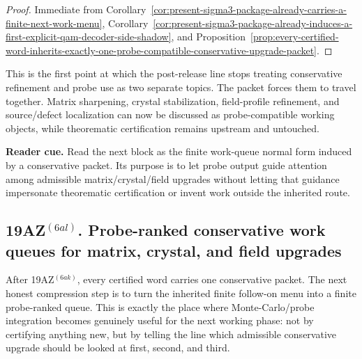 \begin{proof}
Immediate from Corollary~\ref{cor:present-sigma3-package-already-carries-a-finite-next-work-menu}, Corollary~\ref{cor:present-sigma3-package-already-induces-a-first-explicit-qam-decoder-side-shadow}, and Proposition~\ref{prop:every-certified-word-inherits-exactly-one-probe-compatible-conservative-upgrade-packet}.
\end{proof}

\begin{remark}
\label{rem:what-this-conservative-packet-now-buys}
This is the first point at which the post-release line stops treating conservative refinement and probe use as two separate topics. The packet forces them to travel together. Matrix sharpening, crystal stabilization, field-profile refinement, and source/defect localization can now be discussed as probe-compatible working objects, while theorematic certification remains upstream and untouched.
\end{remark}


\noindent\textbf{Reader cue.} Read the next block as the finite work-queue normal form induced by a conservative packet. Its purpose is to let probe output guide attention among admissible matrix/crystal/field upgrades without letting that guidance impersonate theorematic certification or invent work outside the inherited route.

\subsection*{19AZ$^{(6al)}$. Probe-ranked conservative work queues for matrix, crystal, and field upgrades}
\label{sec:probe-ranked-conservative-work-queues-for-matrix-crystal-and-field-upgrades}
After 19AZ$^{(6ak)}$, every certified word carries one conservative packet. The next honest compression step is to turn the inherited finite follow-on menu into a finite probe-ranked queue. This is exactly the place where Monte-Carlo/probe integration becomes genuinely useful for the next working phase: not by certifying anything new, but by telling the line which admissible conservative upgrade should be looked at first, second, and third.

